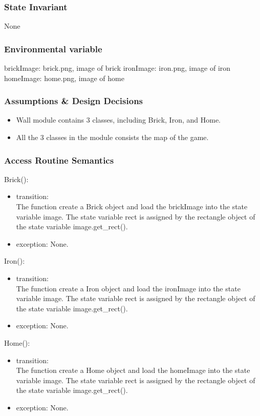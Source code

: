 \documentclass[12pt, titlepage]{article}
\begin{document}
		\subsubsection{State Invariant}
		None
		
		\subsubsection{Environmental variable}
		brickImage: brick.png, image of brick
        ironImage: iron.png, image of iron
        homeImage: home.png, image of home
		\subsubsection{Assumptions \& Design Decisions}
		\begin{itemize}
		\item Wall module contains 3 classes, including Brick, Iron, and Home.
		
		\item All the 3 classes in the module consists the map of the game.
		\end{itemize}
		\subsubsection{Access Routine Semantics}
        Brick():
		\begin{itemize}
		\item transition: \\
	    The function create a Brick object and load the brickImage into the state variable image. The state variable rect is assigned by the rectangle object of the state variable image.get\_rect().
		
		\item exception: None.
        \end{itemize}
        
        Iron():
		\begin{itemize}
		\item transition: \\
	    The function create a Iron object and load the ironImage into the state variable image. The state variable rect is assigned by the rectangle object of the state variable image.get\_rect().
		
		\item exception: None.
        \end{itemize}
        
        Home():
		\begin{itemize}
		\item transition: \\
	    The function create a Home object and load the homeImage into the state variable image. The state variable rect is assigned by the rectangle object of the state variable image.get\_rect().
		
		\item exception: None.
        \end{itemize}
        
\end{document}
